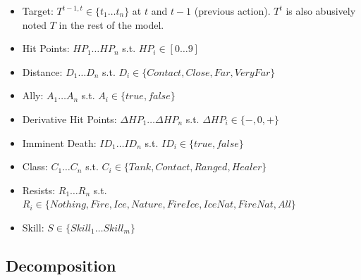 \begin{itemize}
    \item Target: $T^{t-1,t} \in \{t_1\dots t_n\}$ at $t$ and $t-1$ (previous action). $T^t$ is also abusively noted $T$ in the rest of the model.
    \item Hit Points: $HP_1 \dots HP_n$ s.t. $HP_i \in [0\dots 9]$
    \item Distance: $D_1 \dots D_n$ s.t. $D_i \in \{Contact, Close, Far, VeryFar\}$
    \item Ally: $A_1 \dots A_n$ s.t. $A_i \in \{true, false\}$
    \item Derivative Hit Points: $\Delta HP_1 \dots \Delta HP_n$ s.t. $\Delta HP_i \in \{-, 0, +\}$
    \item Imminent Death: $ID_1 \dots ID_n$ s.t. $ID_i \in \{true, false\}$
    \item Class: $C_1 \dots C_n$ s.t. $C_i \in \{Tank, Contact, Ranged, Healer\}$
    \item Resists: $R_1 \dots R_n$ s.t. $R_i \in \{Nothing, Fire, Ice, Nature, FireIce, IceNat, FireNat, All\}$
    \item Skill: $S \in \{Skill_1 \dots Skill_m\}$
\end{itemize}

\subsection{Decomposition}


